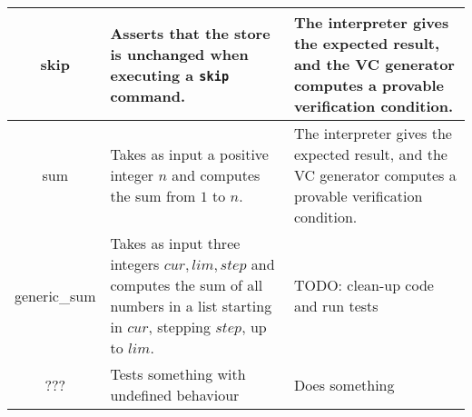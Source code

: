 \begin{tabular}{|c|p{4.4cm}|p{4.4cm}|}
 	\hline
 	skip &
   Asserts that the store is unchanged when executing a \texttt{skip} command. & 
   The interpreter gives the expected result, and the VC generator computes a provable verification condition. \\
 	\hline
 	sum & 
   Takes as input a positive integer $n$ and computes the sum from $1$ to $n$. & 
   The interpreter gives the expected result, and the VC generator computes a provable verification condition. \\
 	\hline
 	generic_sum & 
   Takes as input three integers $cur, lim, step$ and computes the sum of all numbers in a list starting in $cur$, stepping $step$, up to $lim$. &
   TODO: clean-up code and run tests \\
 	\hline
 	??? & 
   Tests something with undefined behaviour &
   Does something \\
 	\hline
\end{tabular}

